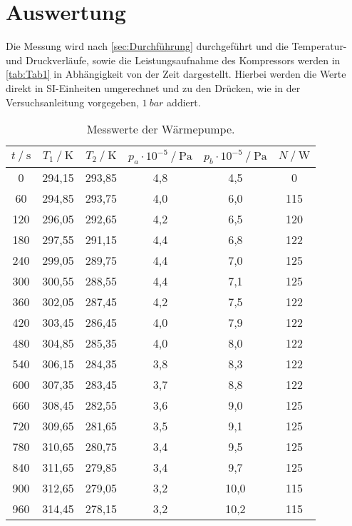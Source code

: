 \section{Auswertung}
\label{sec:Auswertung}
Die Messung wird nach \autoref{sec:Durchführung} durchgeführt und die Temperatur- und Druckverläufe, sowie die Leistungsaufnahme des Kompressors
werden in \autoref{tab:Tab1} in Abhängigkeit von der Zeit dargestellt.
Hierbei werden die Werte direkt in SI-Einheiten umgerechnet und zu den Drücken, wie in der Versuchsanleitung \cite{V206} vorgegeben, 
$\qty{1}{bar}$ addiert.
\begin{table}[H]
	\centering
	\caption{Messwerte der Wärmepumpe.}
	\label{tab:Tab1}
	\begin{tabular}{S[table-format=4.0] S S S[table-format=1.1] S[table-format=2.1] S[table-format=3.0]}
		\toprule
      {$t \mathbin{/} \si{\second}$}&{$T_1 \mathbin{/} \si{\kelvin}$}&{$T_2 \mathbin{/} \si{\kelvin}$}&{$p_a \cdot 10^{-5} \mathbin{/} \si{\pascal}$}&{$p_b \cdot 10^{-5} \mathbin{/} \si{\pascal}$} &
      {$N \mathbin{/} \si{\watt}$}\\
     & 294,15 & 293,85 & 4,8 & 4,5 & 0\\
      60 & 294,85 & 293,75 & 4,0 & 6,0 & 115\\
      120 & 296,05 & 292,65 & 4,2 & 6,5 & 120\\
      180 & 297,55 & 291,15 & 4,4 & 6,8 & 122\\
      240 & 299,05 & 289,75 & 4,4 & 7,0 & 125\\
      300 & 300,55 & 288,55 & 4,4 & 7,1 & 125\\
      360 & 302,05 & 287,45 & 4,2 & 7,5 & 122\\
      420 & 303,45 & 286,45 & 4,0 & 7,9 & 122\\
      480 & 304,85 & 285,35 & 4,0 & 8,0 & 122\\
      540 & 306,15 & 284,35 & 3,8 & 8,3 & 122\\
      600 & 307,35 & 283,45 & 3,7 & 8,8 & 122\\
      660 & 308,45 & 282,55 & 3,6 & 9,0 & 125\\
      720 & 309,65 & 281,65 & 3,5 & 9,1 & 125\\
      780 & 310,65 & 280,75 & 3,4 & 9,5 & 125\\
      840 & 311,65 & 279,85 & 3,4 & 9,7 & 125\\
      900 & 312,65 & 279,05 & 3,2 & 10,0 & 115\\
      960 & 314,45 & 278,15 & 3,2 & 10,2 & 115\\

\end{tabular}
\end{table}
